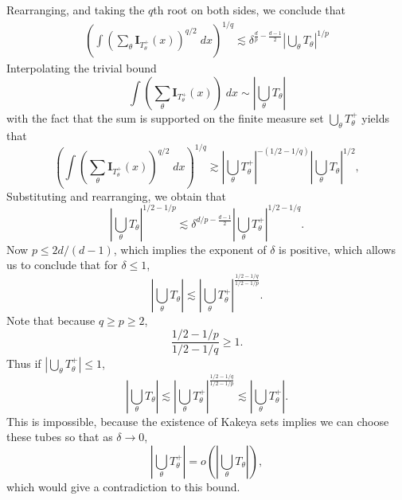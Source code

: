 %
Rearranging, and taking the $q$th root on both sides, we conclude that
%
\begin{align*}
    \left( \int \left( \sum_\theta \mathbf{I}_{T_\theta^+}(x) \right)^{q/2}\; dx \right)^{1/q} \lesssim \delta^{\frac{d}{p} - \frac{d-1}{2}} \left| \bigcup_\theta T_\theta \right|^{1/p}
\end{align*}
%
Interpolating the trivial bound
%
\[ \int \left( \sum_\theta \mathbf{I}_{T_\theta^+}(x) \right)\; dx \sim \left| \bigcup_\theta T_\theta \right| \]
%
with the fact that the sum is supported on the finite measure set $\bigcup_\theta T_\theta^+$ yields that
%
\[ \left( \int \left( \sum_\theta \mathbf{I}_{T_\theta^+}(x) \right)^{q/2}\; dx \right)^{1/q} \gtrsim \left| \bigcup_\theta T_\theta^+ \right|^{-(1/2 - 1/q)} \left| \bigcup_\theta T_\theta \right|^{1/2}, \]
%
Substituting and rearranging, we obtain that
%
\[ \left| \bigcup_\theta T_\theta \right|^{1/2-1/p} \lesssim \delta^{d/p - \frac{d-1}{2}} \left| \bigcup_\theta T_\theta^+ \right|^{1/2 - 1/q}. \]
%
Now $p \leq 2d/(d-1)$, which implies the exponent of $\delta$ is positive, which allows us to conclude that for $\delta \leq 1$,
\[ \left| \bigcup_\theta T_\theta \right| \lesssim \left| \bigcup_\theta T_\theta^+ \right|^{\frac{1/2 - 1/q}{1/2 - 1/p}}. \]
%
Note that because $q \geq p \geq 2$,
%
\[ \frac{1/2 - 1/p}{1/2 - 1/q} \geq 1. \]
%
Thus if $|\bigcup_\theta T_\theta^+| \leq 1$,
%
\[ \left| \bigcup_\theta T_\theta \right| \lesssim \left| \bigcup_\theta T_\theta^+ \right|^{\frac{1/2 - 1/q}{1/2 - 1/p}} \lesssim \left| \bigcup_\theta T_\theta^+ \right|. \]
%
This is impossible, because the existence of Kakeya sets implies we can choose these tubes so that as $\delta \to 0$,
%
\[ \left| \bigcup_\theta T_\theta^+ \right| = o \left( \left| \bigcup_\theta T_\theta \right| \right), \]
%
which would give a contradiction to this bound.

